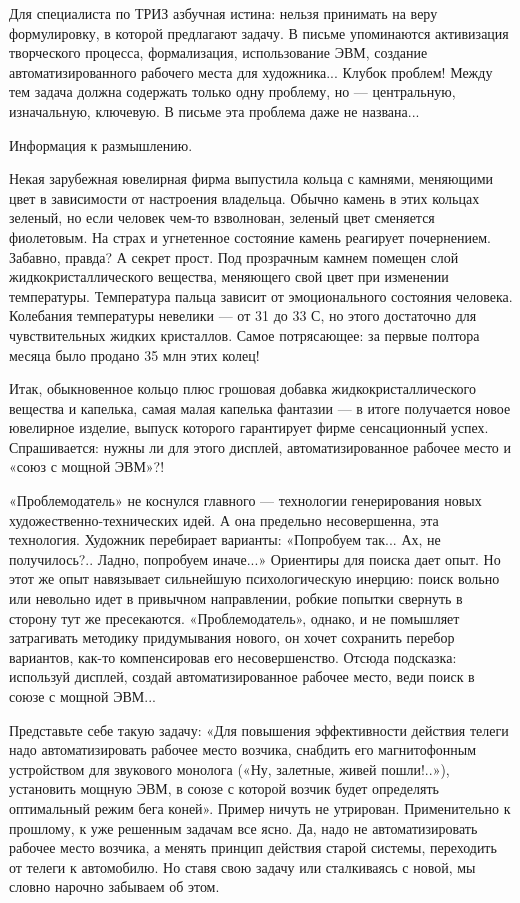Для  специалиста по  ТРИЗ азбучная  истина: нельзя  принимать на  веру
формулировку,  в  которой  предлагают  задачу.  В  письме  упоминаются
активизация  творческого  процесса, формализация,  использование  ЭВМ,
создание  автоматизированного рабочего  места для  художника... Клубок
проблем! Между тем задача должна  содержать только одну проблему, но —
центральную,  изначальную, ключевую.  В  письме эта  проблема даже  не
названа...

Информация к размышлению.

Некая зарубежная ювелирная фирма выпустила кольца с камнями, меняющими
цвет  в зависимости  от  настроения владельца.  Обычно  камень в  этих
кольцах  зеленый,  но если  человек  чем-то  взволнован, зеленый  цвет
сменяется фиолетовым. На страх и угнетенное состояние камень реагирует
почернением. Забавно,  правда? А  секрет прост. Под  прозрачным камнем
помещен слой  жидкокристаллического вещества, меняющего свой  цвет при
изменении  температуры. Температура  пальца зависит  от эмоционального
состояния человека. Колебания  температуры невелики — от 31  до 33 С,
но  этого  достаточно  для  чувствительных  жидких  кристаллов.  Самое
потрясающее: за первые полтора месяца было продано 35 млн этих колец!

Итак, обыкновенное кольцо  плюс грошовая добавка жидкокристаллического
вещества  и  капелька,  самая  малая   капелька  фантазии  —  в  итоге
получается  новое  ювелирное   изделие,  выпуск  которого  гарантирует
фирме сенсационный  успех. Спрашивается:  нужны ли для  этого дисплей,
автоматизированное рабочее место и «союз с мощной ЭВМ»?!

«Проблемодатель» не коснулся главного — технологии генерирования новых
художественно-технических  идей.  А  она предельно  несовершенна,  эта
технология.  Художник перебирает  варианты: «Попробуем  так... Ах,  не
получилось?..  Ладно, попробуем  иначе...» Ориентиры  для поиска  дает
опыт. Но  этот же опыт навязывает  сильнейшую психологическую инерцию:
поиск вольно или невольно идет в привычном направлении, робкие попытки
свернуть в сторону тут же  пресекаются. «Проблемодатель», однако, и не
помышляет затрагивать методику придумывания нового, он хочет сохранить
перебор  вариантов, как-то  компенсировав  его несовершенство.  Отсюда
подсказка: используй дисплей, создай автоматизированное рабочее место,
веди поиск в союзе с мощной ЭВМ...

Представьте себе  такую задачу: «Для повышения  эффективности действия
телеги  надо  автоматизировать  рабочее место  возчика,  снабдить  его
магнитофонным устройством для звукового монолога («Ну, залетные, живей
пошли!..»),  установить мощную  ЭВМ, в  союзе с  которой возчик  будет
определять оптимальный режим бега  коней». Пример ничуть не утрирован.
Применительно к прошлому, к уже решенным задачам все ясно. Да, надо не
автоматизировать  рабочее место  возчика,  а  менять принцип  действия
старой  системы, переходить  от  телеги к  автомобилю.  Но ставя  свою
задачу или сталкиваясь с новой, мы словно нарочно забываем об этом.

